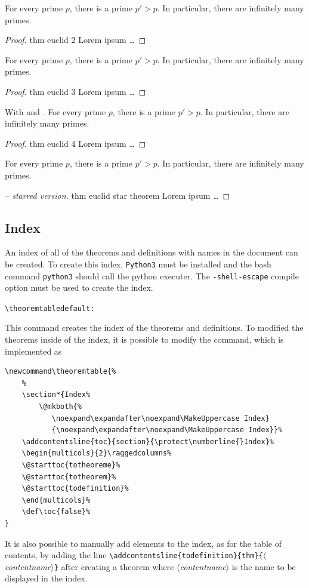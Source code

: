 \documentclass[12pt, babellanguage=british, titlespace, defaulttheorems]{altarticle}
\newcommand{\aargt}[1]{\ensuremath{\langle}\textrm{{\emph{#1}}}\ensuremath{\rangle}}
\newcommand{\argt}[1]{\texttt{\{}\ensuremath{\langle}\textrm{{\emph{#1}}}\ensuremath{\rangle}\texttt{\}}}
\newcommand{\commandline}[1][]{\def\argI{#1}\ccommandline}
\newcommand{\ccommandline}[2][]{\par\medskip\hspace*{-.75cm}\texttt{\textbackslash#2}\argI{}\hfill\if\relax\detokenize{#1}\relax\else\texttt{default:~#1}\fi\par}
\begin{document}
For every prime $p$, there is a prime $p'>p$. In particular, there are infinitely many primes.
\begin{proof}{thm euclid 2}
    Lorem ipsum \dots
\end{proof}
For every prime $p$, there is a prime $p'>p$. In particular, there are infinitely many primes.
\begin{proof}{thm euclid 3}
    Lorem ipsum \dots
\end{proof}
With  and {\boldmath{}}.
For every prime $p$, there is a prime $p'>p$. In particular, there are infinitely many primes.
\begin{proof}{thm euclid 4}
    Lorem ipsum \dots
\end{proof}
For every prime $p$, there is a prime $p'>p$. In particular, there are infinitely many primes.
\begin{proof}[ -- starred version]{thm euclid star theorem}
    Lorem ipsum \dots
\end{proof}
\subsection{Index}
An index of all of the theorems and definitions with names in the document can be created. To create this index, \texttt{Python3} must be installed and the bash command \texttt{python3} should call the python executer. The \texttt{-shell-escape} compile option must be used to create the index.
\commandline{theoremtable}This command creates the index of the theorems and definitions. To modified the theorems inside of the index, it is possible to modify the command, which is implemented as
\begin{verbatim}
\newcommand\theoremtable{%
    %
    \section*{Index%
        \@mkboth{%
           \noexpand\expandafter\noexpand\MakeUppercase Index}
           {\noexpand\expandafter\noexpand\MakeUppercase Index}}%
    \addcontentsline{toc}{section}{\protect\numberline{}Index}%
    \begin{multicols}{2}\raggedcolumns%
    \@starttoc{totheoreme}%
    \@starttoc{totheorem}%
    \@starttoc{todefinition}%
    \end{multicols}%
    \def\toc{false}%
}
\end{verbatim}
It is also possible to manually add elements to the index, as for the table of contents, by adding the line \texttt{\textbackslash addcontentsline\{todefinition\}\{thm\}}\argt{contentname} after creating a theorem where \aargt{contentname} is the name to be displayed in the index.
\end{document}
